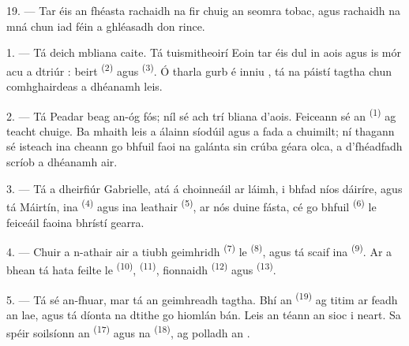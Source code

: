 19. --- Tar éis an fhéasta rachaidh na fir chuig an seomra tobac, agus rachaidh na
mná chun iad féin a ghléasadh don rince.

\VUsaut{5.0mm}
\VUsaut{1.6mm}
\VUsaut{2.6mm}

\VUsaut{3.0mm}

1. --- Tá deich mbliana caite. Tá tuismitheoirí Eoin tar éis dul in aois agus is
mór acu a dtriúr : beirt 
\textsuperscript{(2)} agus  \textsuperscript{(3)}. Ó tharla gurb é
inniu , tá na páistí tagtha chun comhghairdeas a
dhéanamh leis.

2. --- Tá Peadar beag an-óg fós; níl sé ach trí bliana d'aois. Feiceann sé an
 \textsuperscript{(1)} ag teacht chuige. Ba mhaith leis a
 álainn síodúil agus a  fada a chuimilt; ní
thagann sé isteach ina cheann go bhfuil faoi na  galánta sin
crúba géara olca, a d'fhéadfadh scríob a dhéanamh air.

3. --- Tá a dheirfiúr Gabrielle, atá á choinneáil ar láimh, i bhfad níos dáiríre,
agus tá Máirtín, ina  \textsuperscript{(4)} agus ina
 leathair \textsuperscript{(5)}, ar nós duine fásta, cé go bhfuil
 \textsuperscript{(6)} le feiceáil faoina bhrístí gearra.

4. --- Chuir a n-athair air a  tiubh geimhridh
\textsuperscript{(7)} le  \textsuperscript{(8)}, agus tá
scaif ina  \textsuperscript{(9)}. Ar a bhean tá hata feilte le
 \textsuperscript{(10)},  \textsuperscript{(11)},
 fionnaidh \textsuperscript{(12)} agus 
\textsuperscript{(13)}.

5. --- Tá sé an-fhuar, mar tá an geimhreadh tagtha. Bhí an 
\textsuperscript{(19)} ag titim ar feadh an lae, agus tá díonta na dtithe go
hiomlán bán. Leis an  téann an sioc i neart. Sa spéir soilsíonn an
 \textsuperscript{(17)} agus na 
\textsuperscript{(18)}, ag polladh an .

\VUsaut{4.2mm}
\VUsaut{3.0mm}

